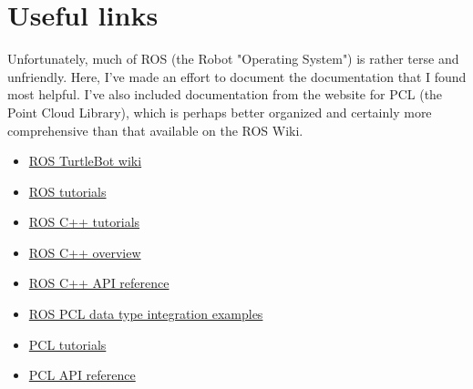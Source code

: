 \documentclass{article}
\begin{document}
\section{Useful links}
Unfortunately, much of ROS (the Robot "Operating System") is rather terse and unfriendly.  Here, I've made an effort to document the documentation that I found most helpful.  I've also included documentation from the website for PCL (the Point Cloud Library), which is perhaps better organized and certainly more comprehensive than that available on the ROS Wiki.
\begin{itemize}
\item{\href{http://ros.org/wiki/Robots/TurtleBot}{ROS TurtleBot wiki}}
\item{\href{http://ros.org/wiki/ROS/Tutorials}{ROS tutorials}}
\item{\href{http://ros.org/wiki/roscpp/Tutorials}{ROS C++ tutorials}}
\item{\href{http://ros.org/wiki/roscpp/Overview}{ROS C++ overview}}
\item{\href{http://ros.org/doc/electric/api/roscpp/html}{ROS C++ API reference}}
\item{\href{http://ros.org/wiki/pcl_ros}{ROS PCL data type integration examples}}
\item{\href{http://pointclouds.org/documentation/tutorials}{PCL tutorials}}
\item{\href{http://docs.pointclouds.org/1.1.0}{PCL API reference}}
\end{itemize}
\end{document}
